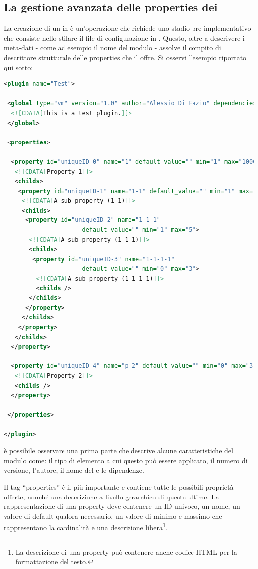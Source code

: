 \subsection{La gestione avanzata delle properties dei \plugin{}}
La creazione di un \plugin{} in \visualnetkit{} è un'operazione che richiede uno stadio pre-implementativo che consiste nello stilare il file di configurazione in \xml{}. Questo, oltre a descrivere i meta-dati - come ad esempio il nome del modulo - assolve il compito di descrittore strutturale delle properties che il \plugin{} offre.
Si osservi l'esempio riportato qui sotto:
\begin{lstlisting}[language=xml]
<plugin name="Test">
 
 <global type="vm" version="1.0" author="Alessio Di Fazio" dependencies="">
  <![CDATA[This is a test plugin.]]>
 </global>
 
 <properties>
  
  <property id="uniqueID-0" name="1" default_value="" min="1" max="1000">
   <![CDATA[Property 1]]>
   <childs>
    <property id="uniqueID-1" name="1-1" default_value="" min="1" max="2">
     <![CDATA[A sub property (1-1)]]>
     <childs>
      <property id="uniqueID-2" name="1-1-1"
                      default_value="" min="1" max="5">
       <![CDATA[A sub property (1-1-1)]]>
       <childs>
        <property id="uniqueID-3" name="1-1-1-1"
                      default_value="" min="0" max="3">
         <![CDATA[A sub property (1-1-1-1)]]>
         <childs />
       </childs>
      </property>
     </childs>
    </property> 
   </childs>
  </property>
  
  <property id="uniqueID-4" name="p-2" default_value="" min="0" max="3">
   <![CDATA[Property 2]]>
   <childs />
  </property>
  
 </properties>
 
</plugin>
\end{lstlisting}
è possibile osservare una prima parte che descrive alcune caratteristiche del modulo come: il tipo di elemento a cui questo può essere applicato, il numero di versione, l'autore, il nome del \plugin{} e le dipendenze.

Il tag ``properties'' è il più importante e contiene tutte le possibili proprietà offerte, nonché una descrizione a livello gerarchico di queste ultime. La rappresentazione di una property deve contenere un ID univoco, un nome, un valore di default qualora necessario, un valore di minimo e massimo che rappresentano la cardinalità e una descrizione libera\footnote{La descrizione di una property può contenere anche codice HTML per la formattazione del testo.}.

